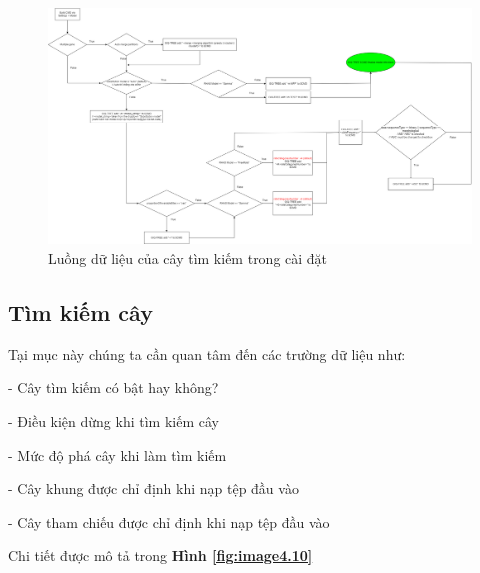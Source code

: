 \documentclass[12pt]{report}
\begin{document}
\begin{figure}[h]
	\centering
	\includegraphics[scale=0.23]{Image/4.9.png}
	\caption{Luồng dữ liệu của cây tìm kiếm trong cài đặt }
	\label{fig:image4.9}
\end{figure}

\subsection{Tìm kiếm cây}
Tại mục này chúng ta cần quan tâm đến các trường dữ liệu như:

- Cây tìm kiếm có bật hay không?

- Điều kiện dừng khi tìm kiếm cây

- Mức độ phá cây khi làm tìm kiếm

- Cây khung được chỉ định khi nạp tệp đầu vào

- Cây tham chiếu được chỉ định khi nạp tệp đầu vào

Chi tiết được mô tả trong  \textbf{Hình \ref{fig:image4.10}}
\end{document}
